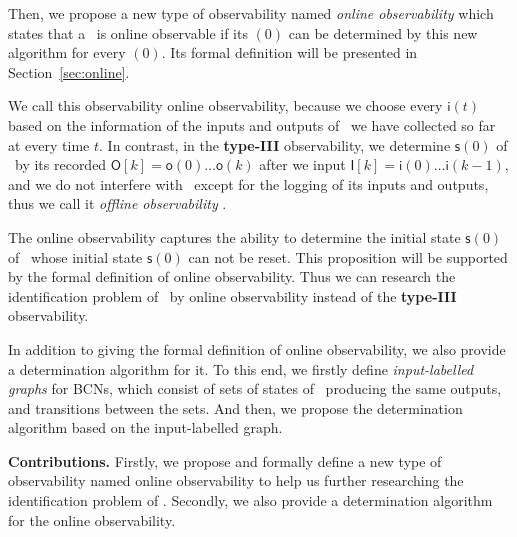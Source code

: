 Then, we propose a new type of observability named {\em online observability} which states that a \BCN\ is online observable if its \State$(0)$ can be determined by this new algorithm for every \State$(0)$. Its formal definition will be presented in Section~\ref{sec:online}.  

We call this observability online observability, because we choose every $\mathsf{i}(t)$ based on the information of the inputs and outputs of \BCN\ we have collected so far at every time $t$. In contrast, in the {\bf type-III} observability, we determine $\mathsf{s}(0)$ of \BCN\ by its recorded $\mathsf{O}[k]=\mathsf{o}(0)\ldots\mathsf{o}(k)$ after we input $\mathsf{I}[k]=\mathsf{i}(0)\ldots\mathsf{i}(k-1)$, and  we do not interfere with \BCN\ except for the logging of its inputs and outputs, thus we call it {\em offline observability} \cite{Cassar2017A}.
 
The online observability captures the ability to determine the initial state $\mathsf{s}(0)$ of \BCN\ whose initial state $\mathsf{s}(0)$ can not be reset. This proposition will be supported by the formal definition of  online observability.  Thus we can research the identification problem of \BCNs\ by online observability instead of the {\bf type-III} observability.




In addition to giving the formal definition of online observability, we also provide a determination algorithm for it. To this end, we firstly define {\em input-labelled graphs} for BCNs, which consist of sets of states of \BCNs\ producing the same outputs, and transitions between the sets. And then, we propose the determination algorithm based on the input-labelled graph.


\medskip\noindent
{\bf Contributions.}
Firstly, we propose and formally define a new type of observability named online observability to help us further researching the identification problem of \BCNs. %
Secondly, we also provide a determination algorithm for the online observability. %

